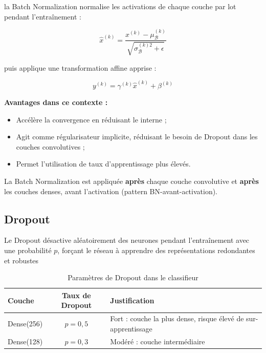 la Batch Normalization
normalise les activations de chaque couche par lot pendant l'entraînement :

\begin{equation}
\hat{x}^{(k)} = \frac{x^{(k)} - \mu_{\mathcal{B}}^{(k)}}{\sqrt{\sigma_{\mathcal{B}}^{(k)2} + \epsilon}}
\end{equation}

puis applique une transformation affine apprise :

\begin{equation}
y^{(k)} = \gamma^{(k)} \hat{x}^{(k)} + \beta^{(k)}
\end{equation}

\textbf{Avantages dans ce contexte :}
\begin{itemize}
  \item Accélère la convergence en réduisant le  interne ;
  \item Agit comme régularisateur implicite, réduisant le besoin de Dropout
        dans les couches convolutives ;
  \item Permet l'utilisation de taux d'apprentissage plus élevés.
\end{itemize}

La Batch Normalization est appliquée \textbf{après} chaque couche convolutive et \textbf{après}
les couches denses, avant l'activation (pattern BN-avant-activation).

\subsection{Dropout}

Le Dropout désactive aléatoirement des neurones pendant
l'entraînement avec une probabilité $p$, forçant le réseau à apprendre des
représentations redondantes et robustes 
\begin{table}[H]
\centering
\caption{Paramètres de Dropout dans le classifieur}
\label{tab:dropout}
\begin{tabular}{|l|c|p{8cm}|}
\toprule
\textbf{Couche} & \textbf{Taux de Dropout} & \textbf{Justification} \\
\midrule
Dense(256) & $p = 0{,}5$ & Fort : couche la plus dense, risque élevé de sur-apprentissage \\
\hline
Dense(128) & $p = 0{,}3$ & Modéré : couche intermédiaire \\
\bottomrule
\end{tabular}
\end{table}


